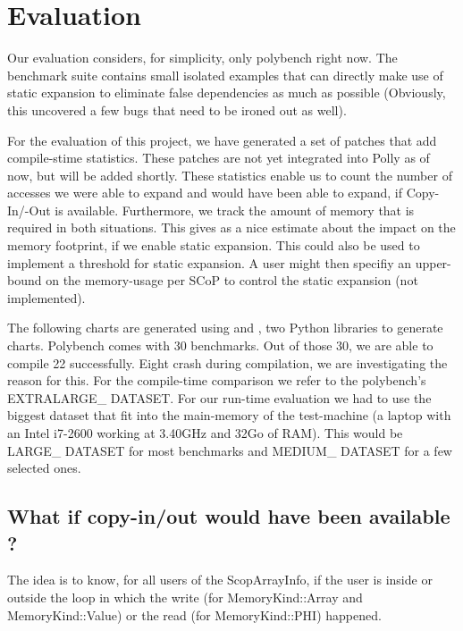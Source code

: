 \chapter{Evaluation}\label{ch:Evaluation}

Our evaluation considers, for simplicity, only polybench right now. The benchmark suite contains small isolated examples that can directly make use of static expansion to eliminate false dependencies as much as possible (Obviously, this uncovered a few bugs that need to be ironed out as well).

For the evaluation of this project, we have generated a set of patches that add compile-stime statistics. These patches are not yet integrated into Polly as of now, but will be added shortly. These statistics enable us to count the number of accesses we were able to expand and would have been able to expand, if Copy-In/-Out is available. Furthermore, we track the amount of memory that is required in both situations. This gives as a nice estimate about the impact on the memory footprint, if we enable static expansion. This could also be used to implement a threshold for static expansion. A user might then specifiy an upper-bound on the memory-usage per SCoP to control the static expansion (not implemented).

The following charts are generated using  and , two Python libraries to generate charts. Polybench comes with 30 benchmarks. Out of those 30, we are able to compile 22 successfully. Eight crash during compilation, we are investigating the reason for this. For the compile-time comparison we refer to the polybench’s EXTRALARGE\_ DATASET. For our run-time evaluation we had to use the biggest dataset that fit into the main-memory of the test-machine (a laptop with an Intel i7-2600 working at 3.40GHz and 32Go of RAM). This would be LARGE\_ DATASET for most benchmarks and MEDIUM\_ DATASET for a few selected ones.

\section{What if copy-in/out would have been available ?}
The idea is to know, for all users of the ScopArrayInfo, if the user is inside or outside the loop in which the write (for MemoryKind::Array and MemoryKind::Value) or the read (for MemoryKind::PHI) happened.

